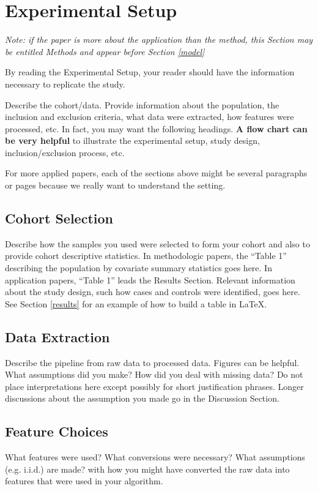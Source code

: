 \documentclass[twoside,11pt]{article}
\begin{document}
\section{Experimental Setup} \label{experiment}
\emph{Note: if the paper is more about the application than the method, this Section may be entitled Methods and appear before Section \ref{model}}

By reading the Experimental Setup, your reader should have the information necessary to replicate the study.

Describe the cohort/data. Provide information about the population, the inclusion and exclusion criteria, what data were extracted, how features were processed, etc. In fact, you may want the following headings. \textbf{A flow chart can be very helpful} to illustrate the experimental setup, study design, inclusion/exclusion process, etc.

For more applied papers, each of the sections above might be several paragraphs or pages because we really want to understand the setting.

\subsection{Cohort Selection} 
Describe how the samples you used were selected to form your cohort and also to provide cohort descriptive statistics. In methodologic papers, the ``Table 1'' describing the population by covariate summary statistics goes here. In application papers, ``Table 1'' leads the Results Section. Relevant information about the study design, such how cases and controls were identified, goes here. See Section \ref{results} for an example of how to build a table in LaTeX.

\subsection{Data Extraction} 
Describe the pipeline from raw data to processed data. Figures can be helpful. What assumptions did you make? How did you deal with missing data? Do not place interpretations here except possibly for short justification phrases. Longer discussions about the assumption you made go in the Discussion Section.

\subsection{Feature Choices} 
What features were used? What conversions were necessary? What assumptions (e.g. i.i.d.) are made? with how you might have converted the raw data into features that were used in your algorithm. 
\end{document}
